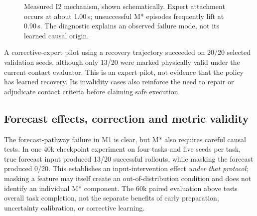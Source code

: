 \documentclass[conference]{IEEEtran}
\begin{document}
\begin{figure}[t]
\centering
{}
\caption{Measured I2 mechanism, shown schematically. Expert attachment occurs at about 1.00\,s; unsuccessful M* episodes frequently lift at 0.90\,s. The diagnostic explains an observed failure mode, not its learned causal origin.}
\label{fig:i2}
\end{figure}

A corrective-expert pilot using a recovery trajectory succeeded on 20/20 selected validation seeds, although only 13/20 were marked physically valid under the current contact evaluator. This is an expert pilot, not evidence that the policy has learned recovery. Its invalidity cases also reinforce the need to repair or adjudicate contact criteria before claiming safe execution.

\subsection{Forecast effects, correction and metric validity}
The forecast-pathway failure in M1 is clear, but M* also requires careful causal tests. In one 40k checkpoint experiment on four tasks and five seeds per task, true forecast input produced 13/20 successful rollouts, while masking the forecast produced 0/20. This establishes an input-intervention effect \emph{under that protocol}; masking a feature may itself create an out-of-distribution condition and does not identify an individual M* component. The 60k paired evaluation above tests overall task completion, not the separate benefits of early preparation, uncertainty calibration, or corrective learning.
\end{document}
